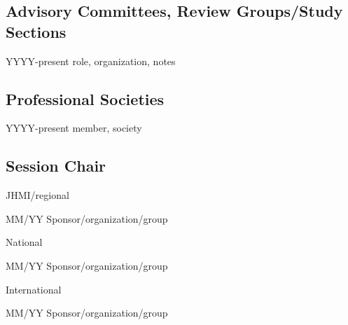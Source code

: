 \documentclass[11pt]{article}
\newenvironment{lyxlist}[1]
	{\begin{list}{}
		{\setlength\itemsep{-0.5ex}
		\settowidth{\labelwidth}{#1}
		 \setlength{\leftmargin}{\labelwidth}
		 \addtolength{\leftmargin}{\labelsep}
		 \renewcommand{\makelabel}[1]{##1\hfil}}}
	{\end{list}}
\begin{document}
\subsection*{Advisory Committees, Review Groups/Study Sections}
\begin{lyxlist}{JHMI/regional}
\item[{YYYY-present}]role, organization, notes

\end{lyxlist}


\subsection*{Professional Societies}

\begin{lyxlist}{JHMI/regional}
\item[{YYYY-present}]member, society

\end{lyxlist}

\subsection*{Session Chair}
\begin{lyxlist}{JHMI/regional}
\item[{\textcolor{color1}{JHMI/regional}}]

\item[{MM/YY}]Sponsor/organization/group

\item[{\textcolor{color1}{National}}]

\item[{MM/YY}]Sponsor/organization/group

\item[{\textcolor{color1}{International}}]

\item[{MM/YY}]Sponsor/organization/group


\end{lyxlist}
\end{document}
